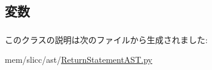 \subsection{変数}
\hypertarget{classslicc_1_1ast_1_1ReturnStatementAST_1_1ReturnStatementAST_a4faa2d9c34d29aa06b2dacd8c3aee45d}{
\subsubsection[{expr\_\-ast}]{}}
\label{classslicc_1_1ast_1_1ReturnStatementAST_1_1ReturnStatementAST_a4faa2d9c34d29aa06b2dacd8c3aee45d}


このクラスの説明は次のファイルから生成されました:\begin{DoxyCompactItemize}
\item 
mem/slicc/ast/\hyperlink{ReturnStatementAST_8py}{ReturnStatementAST.py}\end{DoxyCompactItemize}

